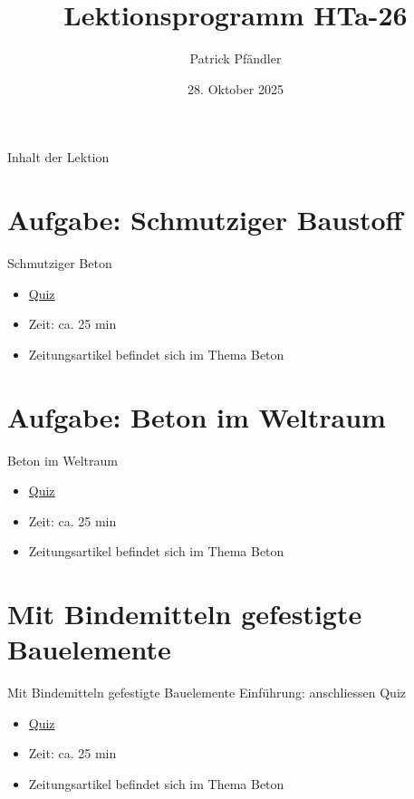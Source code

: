 

\usepackage{ifpdf}
\ifpdf
    
\else
    
\fi


\title{\textbf{Lektionsprogramm HTa-26}}
\author{Patrick Pfändler}
\date{28. Oktober 2025}




\frame{\titlepage}

\begin{frame}{Inhalt der Lektion}
    \tableofcontents
\end{frame}


\section{Aufgabe: Schmutziger Baustoff}

\begin{frame}{Schmutziger Beton}
\begin{itemize}
	\item \href{https://www.classtime.com/code/8UH5E9}{Quiz}
	\item Zeit: ca. 25 min
	\item Zeitungsartikel befindet sich im Thema Beton
\end{itemize}
\end{frame}

%
\section{Aufgabe:  Beton im Weltraum}
\begin{frame}{Beton im Weltraum}
\begin{itemize}
	\item \href{https://www.classtime.com/code/286Y96}{Quiz}
	\item Zeit: ca. 25 min
	\item Zeitungsartikel befindet sich im Thema Beton
\end{itemize}
\end{frame}

\section{Mit Bindemitteln gefestigte Bauelemente }
\begin{frame}{Mit Bindemitteln gefestigte Bauelemente }
Einführung: anschliessen Quiz
\begin{itemize}
	\item \href{https://www.classtime.com/code/AH2ZVJ}{Quiz}
	\item Zeit: ca. 25 min
	\item Zeitungsartikel befindet sich im Thema Beton
\end{itemize}
\end{frame}

